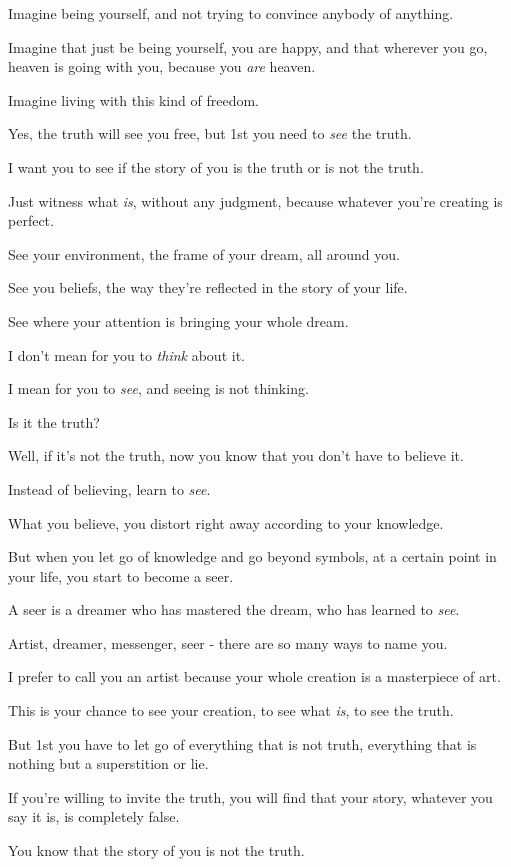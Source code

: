 \documentclass{article}
\numberwithin{equation}{section}
\begin{document}
Imagine being yourself, and not trying to convince anybody of anything.

Imagine that just be being yourself, you are happy, and that wherever you go, heaven is going with you, because you \textit{are} heaven.

Imagine living with this kind of freedom.

Yes, the truth will see you free, but 1st you need to \textit{see} the truth.

%
I want you to see if the story of you is the truth or is not the truth.

Just witness what \textit{is}, without any judgment, because whatever you're creating is perfect.

See your environment, the frame of your dream, all around you.

See you beliefs, the way they're reflected in the story of your life.

See where your attention is bringing your whole dream.

I don't mean for you to \textit{think} about it.

I mean for you to \textit{see}, and seeing is not thinking.

Is it the truth?

%
Well, if it's not the truth, now you know that you don't have to believe it.

Instead of believing, learn to \textit{see}.

What you believe, you distort right away according to your knowledge.

But when you let go of knowledge and go beyond symbols, at a certain point in your life, you start to become a seer.

A seer is a dreamer who has mastered the dream, who has learned to \textit{see}.

Artist, dreamer, messenger, seer - there are so many ways to name you.

I prefer to call you an artist because your whole creation is a masterpiece of art.

%
This is your chance to see your creation, to see what \textit{is}, to see the truth.

But 1st you have to let go of everything that is not truth, everything that is nothing but a superstition or lie.

If you're willing to invite the truth, you will find that your story, whatever you say it is, is completely false.

You know that the story of you is not the truth.
\end{document}
